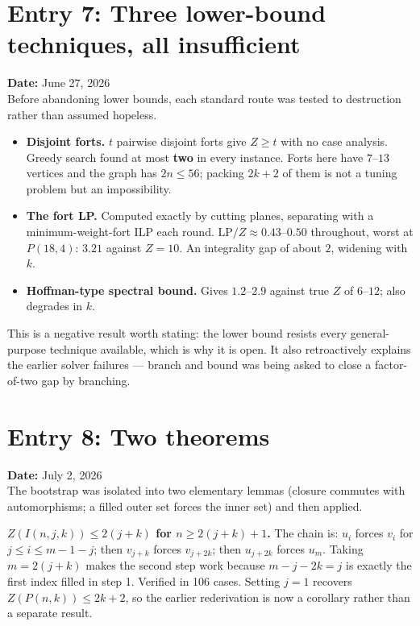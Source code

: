 \documentclass[12pt]{article}
\begin{document}
\clearpage
\section*{Entry 7: Three lower-bound techniques, all insufficient}
\textbf{Date:} June 27, 2026\\
Before abandoning lower bounds, each standard route was tested to destruction
rather than assumed hopeless.
\begin{itemize}
\item \textbf{Disjoint forts.} $t$ pairwise disjoint forts give $Z\ge t$ with
no case analysis. Greedy search found at most \textbf{two} in every instance.
Forts here have $7$--$13$ vertices and the graph has $2n\le56$; packing $2k+2$
of them is not a tuning problem but an impossibility.
\item \textbf{The fort LP.} Computed exactly by cutting planes, separating with
a minimum-weight-fort ILP each round. $\mathrm{LP}/Z\approx0.43$--$0.50$
throughout, worst at $P(18,4)$: $3.21$ against $Z=10$. An integrality gap of
about $2$, widening with $k$.
\item \textbf{Hoffman-type spectral bound.} Gives $1.2$--$2.9$ against true $Z$
of $6$--$12$; also degrades in $k$.
\end{itemize}
This is a negative result worth stating: the lower bound resists every
general-purpose technique available, which is why it is open. It also
retroactively explains the earlier solver failures --- branch and bound was
being asked to close a factor-of-two gap by branching.


\clearpage
\section*{Entry 8: Two theorems}
\textbf{Date:} July 2, 2026\\
The bootstrap was isolated into two elementary lemmas (closure commutes with
automorphisms; a filled outer set forces the inner set) and then applied.

\textbf{$Z(I(n,j,k))\le 2(j+k)$ for $n\ge2(j+k)+1$.} The chain is: $u_i$ forces
$v_i$ for $j\le i\le m-1-j$; then $v_{j+k}$ forces $v_{j+2k}$; then $u_{j+2k}$
forces $u_m$. Taking $m=2(j+k)$ makes the second step work because
$m-j-2k=j$ is exactly the first index filled in step 1. Verified in 106 cases.
Setting $j=1$ recovers $Z(P(n,k))\le2k+2$, so the earlier rederivation is now
a corollary rather than a separate result.
\end{document}
